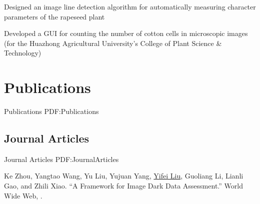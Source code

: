 \documentclass[letterpaper,10pt,oneside]{article}
\begin{document}
\begin{body}
\GapNoBreak
\BulletItem
Designed an image line detection algorithm for automatically measuring character parameters of the rapeseed plant

\GapNoBreak
\BulletItem
Developed a GUI for counting the number of cotton cells in microscopic images (for the Huazhong Agricultural University's College of Plant Science \& Technology)


\section
{Publications}
{Publications}
{PDF:Publications}

\iffalse
\subsection
{Journals}
{Journals}
{PDF:Journals}

\GapNoBreak
\NumberedItem{[11]}
\href{http://www.example.com/my-paper-doi-5}
{\underline{J.~Doe}, J.~Citizen, and A.~Yone,
``On lasers and climate change,''
\textit{Journal of Science},
vol.~89,
no.~2,
pp.~4123--4133,
\DatestampYM{2008}{02}.}

\Gap
\NumberedItem{{\CharSpace}[1]}
\href{http://www.example.com/my-paper-doi-4}
{\underline{J.~Doe} and J.~Citizen,
``Measuring the extent of climate change,''
\textit{Global Scientific Journal},
vol.~12,
no.~4,
pp.~330--352,
\DatestampYM{2006}{12}.}
\fi


\subsection
{Journal Articles}
{Journal Articles}
{PDF:JournalArticles}
\GapNoBreak

\NumberedItem{[1]}
Ke Zhou, Yangtao Wang, Yu Liu, Yujuan Yang, \underline{Yifei Liu}, Guoliang Li, Lianli Gao, and Zhili Xiao.
``A Framework for Image Dark Data Assessment.'' 
World Wide Web,
.


\end{body}
\end{document}

